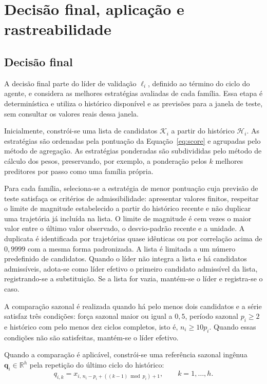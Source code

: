\section{Decisão final, aplicação e rastreabilidade}
\label{sec:aplicacao}

\subsection{Decisão final}
\label{subsec:decisao-final}

A decisão final parte do líder de validação $\ell_i$, definido ao término do ciclo do agente, e considera as melhores estratégias avaliadas de cada família. Essa etapa é determinística e utiliza o histórico disponível e as previsões para a janela de teste, sem consultar os valores reais dessa janela.

Inicialmente, constrói-se uma lista de candidatos $\mathcal{K}_i$ a partir do histórico $\mathcal{H}_i$. As estratégias são ordenadas pela pontuação da Equação~\eqref{eq:score} e agrupadas pelo método de agregação. As estratégias ponderadas são subdivididas pelo método de cálculo dos pesos, preservando, por exemplo, a ponderação pelos $k$ melhores preditores por passo como uma família própria.

Para cada família, seleciona-se a estratégia de menor pontuação cuja previsão de teste satisfaça os critérios de admissibilidade: apresentar valores finitos, respeitar o limite de magnitude estabelecido a partir do histórico recente e não duplicar uma trajetória já incluída na lista. O limite de magnitude é cem vezes o maior valor entre o último valor observado, o desvio-padrão recente e a unidade. A duplicata é identificada por trajetórias quase idênticas ou por correlação acima de $0{,}9999$ com a mesma forma padronizada. A lista é limitada a um número predefinido de candidatos. Quando o líder não integra a lista e há candidatos admissíveis, adota-se como líder efetivo o primeiro candidato admissível da lista, registrando-se a substituição. Se a lista for vazia, mantém-se o líder e registra-se o caso.

A comparação sazonal é realizada quando há pelo menos dois candidatos e a série satisfaz três condições: força sazonal maior ou igual a $0{,}5$, período sazonal $p_i \geq 2$ e histórico com pelo menos dez ciclos completos, isto é, $n_i \geq 10p_i$. Quando essas condições não são satisfeitas, mantém-se o líder efetivo.


Quando a comparação é aplicável, constrói-se uma referência sazonal ingênua $\mathbf{q}_i \in \mathbb{R}^{h}$ pela repetição do último ciclo do histórico:
\[
    q_{i,k}
    =
    x_{i,\,n_i-p_i+((k-1)\bmod p_i)+1},
    \qquad k=1,\ldots,h.
\]

